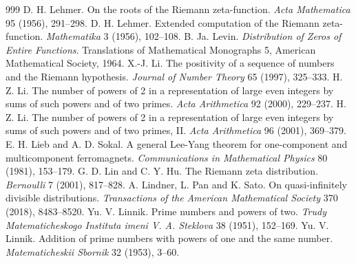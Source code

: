 \begin{thebibliography}{999}
 D. H. Lehmer. On the roots of the Riemann zeta-function. \emph{Acta Mathematica} 95 (1956), 291--298.
 D. H. Lehmer. Extended computation of the Riemann zeta-function. \emph{Mathematika} 3 (1956), 102--108.
 B. Ja. Levin. \emph{Distribution of Zeros of Entire Functions}. Translations of Mathematical Monographs 5, American Mathematical Society, 1964.
 X.-J. Li. The positivity of a sequence of numbers and the Riemann hypothesis. \emph{Journal of Number Theory} 65 (1997), 325--333.
 H. Z. Li. The number of powers of 2 in a representation of large even integers by sums of such powers and of two primes. \emph{Acta Arithmetica} 92 (2000), 229--237.
 H. Z. Li. The number of powers of 2 in a representation of large even integers by sums of such powers and of two primes, II. \emph{Acta Arithmetica} 96 (2001), 369--379.
 E. H. Lieb and A. D. Sokal. A general Lee-Yang theorem for one-component and multicomponent ferromagnets. \emph{Communications in Mathematical Physics} 80 (1981), 153--179.
 G. D. Lin and C. Y. Hu. The Riemann zeta distribution. \emph{Bernoulli} 7 (2001), 817--828.
 A. Lindner, L. Pan and K. Sato. On quasi-infinitely divisible distributions. \emph{Transactions of the American Mathematical Society} 370 (2018), 8483--8520.
 Yu. V. Linnik. Prime numbers and powers of two. \emph{Trudy Matematicheskogo Instituta imeni V. A. Steklova} 38 (1951), 152--169.
 Yu. V. Linnik. Addition of prime numbers with powers of one and the same number. \emph{Matematicheskii Sbornik} 32 (1953), 3--60.

\end{thebibliography}
